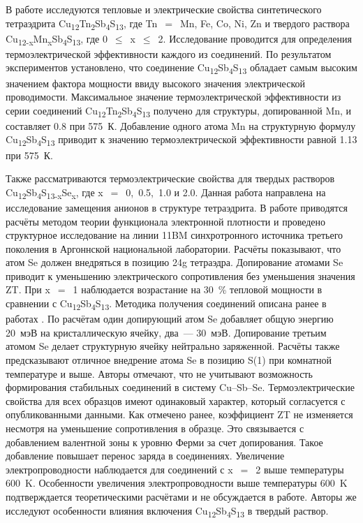 В работе \cite{Heo2014} исследуются тепловые и электрические свойства синтетического тетраэдрита Cu\textsubscript{12}Tn\textsubscript{2}Sb\textsubscript{4}S\textsubscript{13}, где Tn~$=$~Mn, Fe, Co, Ni, Zn и твердого раствора Cu\textsubscript{12-x}Mn\textsubscript{x}Sb\textsubscript{4}S\textsubscript{13}, где 0~$\leq$~x~$\leq$~2. Исследование проводится для определения термоэлектрической эффективности каждого из соединений. По результатом экспериментов установлено, что соединение Cu\textsubscript{12}Sb\textsubscript{4}S\textsubscript{13} обладает самым высоким значением фактора мощности ввиду высокого значения электрической проводимости. Максимальное значение термоэлектрической эффективности из серии соединений Cu\textsubscript{12}Tn\textsubscript{2}Sb\textsubscript{4}S\textsubscript{13} получено для структуры, допированной Mn, и составляет 0.8 при 575~К. Добавление одного атома  Mn на структурную формулу Cu\textsubscript{12}Sb\textsubscript{4}S\textsubscript{13} приводит к значению термоэлектрической эффективности равной 1.13 при 575~К.

Также рассматриваются термоэлектрические свойства для твердых растворов Cu\textsubscript{12}Sb\textsubscript{4}S\textsubscript{13-x}Se\textsubscript{x}, где x~$=$~0,~0.5,~1.0 и 2.0\cite{Lu2016}.
Данная работа направлена на исследование замещения анионов в структуре тетраэдрита.
В работе приводятся расчёты методом теории функционала электронной плотности и проведено структурное исследование на линии 11BM  синхротронного источника третьего поколения в Аргоннской национальной лаборатории.
Расчёты показывают, что атом Se должен внедряться в позицию 24g тетраэдра.
Допирование атомами Se приводит к уменьшению электрического сопротивления без уменьшения значения ZT.
При x~$=$~1 наблюдается возрастание на 30~\% тепловой мощности в сравнении с Cu\textsubscript{12}Sb\textsubscript{4}S\textsubscript{13}.
Методика получения соединений описана ранее в работах \cite{Lu2013,Lu_2013b,Lu_2013}. По расчётам один допирующий атом Se  добавляет общую энергию 20~мэВ на кристаллическую ячейку, два~--- 30~мэВ.
Допирование третьим атомом Se делает структурную ячейку нейтрально заряженной. Расчёты также предсказывают отличное внедрение атома Se в позицию S(1) при комнатной температуре и выше. Авторы отмечают, что не учитывают возможность формирования стабильных соединений в систему Cu--Sb--Se.
Термоэлектрические свойства для всех образцов имеют одинаковый характер, который согласуется с опубликованными данными.
Как отмечено ранее, коэффициент ZT не изменяется несмотря на уменьшение сопротивления в образце.
Это связывается с добавлением  валентной зоны к уровню Ферми за счет допирования.
Такое добавление повышает перенос заряда в соединениях.
Увеличение электропроводности наблюдается для соединений с  x~$=$~2 выше температуры 600~K. Особенности увеличения электропроводности выше температуры 600~K подтверждается теоретическими расчётами и не обсуждается в работе.
Авторы же исследуют особенности влияния включения Cu\textsubscript{12}Sb\textsubscript{4}S\textsubscript{13} в твердый раствор.

